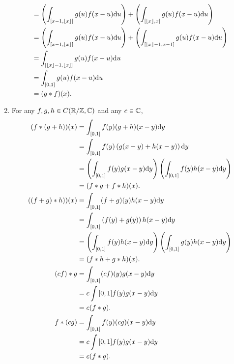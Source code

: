 \documentclass{article}
\begin{document}
\begin{enumerate}[label=(\alph*)]
\begin{align*}
                 &= \left( \int_{[x-1,\left\lfloor x \right\rfloor]} g(u)f(x-u) \mathrm{d} u \right) + \left( \int_{[\left\lfloor x \right\rfloor,x]} g(u)f(x-u) \mathrm{d} u \right) \\
                 &= \left( \int_{[x-1,\left\lfloor x \right\rfloor]} g(u)f(x-u) \mathrm{d} u \right) + \left( \int_{[\left\lfloor x \right\rfloor-1,x-1]} g(u)f(x-u) \mathrm{d} u \right) \\
                 &= \int_{[\left\lfloor x \right\rfloor-1,\left\lfloor x \right\rfloor]} g(u)f(x-u) \mathrm{d} u \\
                 &= \int_{[0,1]} g(u)f(x-u) \mathrm{d} u \\
                 &= (g*f)(x).
    \end{align*}
\item For any $f, g, h \in C(\mathbb{R}/\mathbb{Z}, \mathbb{C})$ and any $c \in \mathbb{C}$, \begin{align*}
        (f*(g+h))(x) &= \int_{[0,1]} f(y) (g+h)(x-y) \mathrm{d} y \\
                &= \int_{[0,1]} f(y) \left( g(x-y)+h(x-y) \right) \mathrm{d} y \\
                &= \left( \int_{[0,1]} f(y) g(x-y) \mathrm{d} y \right) \left( \int_{[0,1]} f(y) h(x-y) \mathrm{d} y \right) \\
                &= (f*g+f*h)(x). \\
        ((f+g)*h))(x) &= \int_{[0,1]} (f+g)(y) h(x-y) \mathrm{d} y \\
                      &= \int_{[0,1]} \left( f(y) +g(y) \right) h(x-y) \mathrm{d} y \\
                &= \left( \int_{[0,1]} f(y) h(x-y) \mathrm{d} y \right) \left( \int_{[0,1]} g(y) h(x-y) \mathrm{d} y \right) \\
                &= (f*h+g*h)(x). \\
        (cf)*g &= \int_{[0,1]} (cf)(y)g(x-y) \mathrm{d} y \\
               &= c \int{[0,1]} f(y)g(x-y) \mathrm{d} y \\
               &= c(f*g). \\
        f*(cg) &= \int_{[0,1]} f(y)(cg)(x-y) \mathrm{d} y \\
               &= c \int{[0,1]} f(y)g(x-y) \mathrm{d} y \\
               &= c(f*g).
\end{align*}
\end{enumerate}
\end{document}
